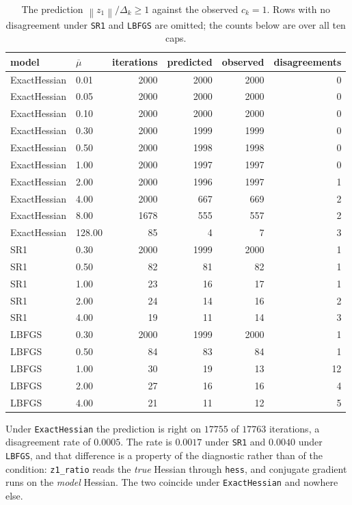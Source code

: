 \documentclass[11pt,a4paper]{article}
\providecommand{\norm}[1]{\left \lVert #1 \right \rVert}
\theoremstyle{remark}
\begin{document}
\begin{table}[H]
  \centering\small
  \caption{The prediction $\norm{z_1}/\Delta_k \geq 1$ against the observed
    $c_k = 1$. Rows with no disagreement under \texttt{SR1} and \texttt{LBFGS}
    are omitted; the counts below are over all ten caps.}
  \label{tab: three}
  \begin{tabular}{llrrrr}
    \toprule
    model & $\overline{\mu}$ & iterations & predicted & observed & disagreements \\
    \midrule
    ExactHessian & 0.01 & 2000 & 2000 & 2000 & 0 \\
    ExactHessian & 0.05 & 2000 & 2000 & 2000 & 0 \\
    ExactHessian & 0.10 & 2000 & 2000 & 2000 & 0 \\
    ExactHessian & 0.30 & 2000 & 1999 & 1999 & 0 \\
    ExactHessian & 0.50 & 2000 & 1998 & 1998 & 0 \\
    ExactHessian & 1.00 & 2000 & 1997 & 1997 & 0 \\
    ExactHessian & 2.00 & 2000 & 1996 & 1997 & 1 \\
    ExactHessian & 4.00 & 2000 & 667 & 669 & 2 \\
    ExactHessian & 8.00 & 1678 & 555 & 557 & 2 \\
    ExactHessian & 128.00 & 85 & 4 & 7 & 3 \\
    \midrule
    SR1 & 0.30 & 2000 & 1999 & 2000 & 1 \\
    SR1 & 0.50 & 82 & 81 & 82 & 1 \\
    SR1 & 1.00 & 23 & 16 & 17 & 1 \\
    SR1 & 2.00 & 24 & 14 & 16 & 2 \\
    SR1 & 4.00 & 19 & 11 & 14 & 3 \\
    \midrule
    LBFGS & 0.30 & 2000 & 1999 & 2000 & 1 \\
    LBFGS & 0.50 & 84 & 83 & 84 & 1 \\
    LBFGS & 1.00 & 30 & 19 & 13 & 12 \\
    LBFGS & 2.00 & 27 & 16 & 16 & 4 \\
    LBFGS & 4.00 & 21 & 11 & 12 & 5 \\
    \bottomrule
  \end{tabular}
\end{table}

Under \texttt{ExactHessian} the prediction is right on $17755$ of $17763$
iterations, a disagreement rate of $0.0005$. The rate is $0.0017$ under
\texttt{SR1} and $0.0040$ under \texttt{LBFGS}, and that difference is a property
of the diagnostic rather than of the condition: \texttt{z1\_ratio} reads the
\emph{true} Hessian through \texttt{hess}, and conjugate gradient runs on the
\emph{model} Hessian. The two coincide under \texttt{ExactHessian} and nowhere
else.
\end{document}
